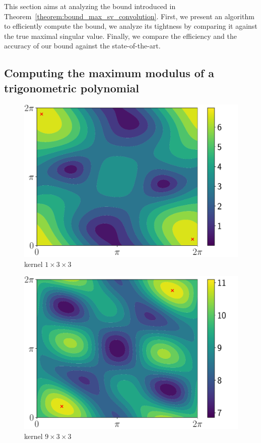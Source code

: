 This section aims at analyzing the bound introduced in Theorem~\ref{theorem:bound_max_sv_convolution}.
First, we present an algorithm to efficiently compute the bound, we analyze its tightness by comparing it against the true maximal singular value.
Finally, we compare the efficiency and the accuracy of our bound against the state-of-the-art. 

\subsection{Computing the maximum modulus of a trigonometric polynomial}\label{subsection:computing_max_modulus_trig_polynomial}


\begin{figure}[htb]
  \centering
  \begin{minipage}{.24\linewidth}
    \centering
    \includegraphics[scale=0.23]{figures/main/ch5-lipschitz_regularization/contour_poly_200_1_1_3.pdf}\\kernel $1\times3\times3$
  \end{minipage}
  \begin{minipage}{.24\linewidth}
      \centering
      \includegraphics[scale=0.23]{figures/main/ch5-lipschitz_regularization/contour_poly_200_1_9_3.pdf}\\kernel $9\times3\times3$

\end{minipage}
\end{figure}
